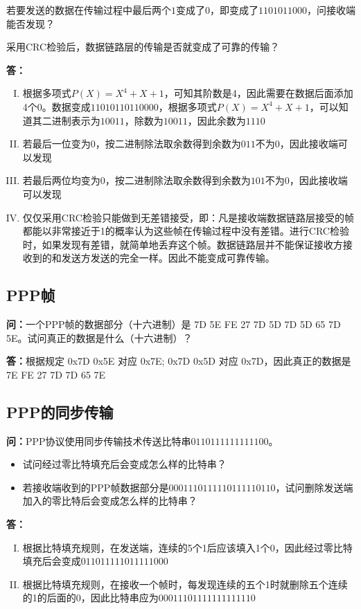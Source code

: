 \documentclass[12pt,hyperref,a4paper,UTF8]{ctexart}
\begin{document}
若要发送的数据在传输过程中最后两个$1$变成了$0$，即变成了$1101011000$，问接收端能否发现？

采用CRC检验后，数据链路层的传输是否就变成了可靠的传输？

\textbf{答：}
\begin{enumerate}[I.]
    \item 根据多项式$P(X)=X^4+X+1$，可知其阶数是4，因此需要在数据后面添加4个$0$。数据变成$11010110110000$，根据多项式$P(X)=X^4+X+1$，可以知道其二进制表示为$10011$，除数为$10011$，因此余数为$1110$
    \item  若最后一位变为$0$，按二进制除法取余数得到余数为$011$不为$0$，因此接收端可以发现 
    \item  若最后两位均变为$0$，按二进制除法取余数得到余数为$101$不为$0$，因此接收端可以发现
    \item 仅仅采用CRC检验只能做到无差错接受，即：凡是接收端数据链路层接受的帧都能以非常接近于1的概率认为这些帧在传输过程中没有差错。进行CRC检验时，如果发现有差错，就简单地丢弃这个帧。数据链路层并不能保证接收方接收到的和发送方发送的完全一样。因此不能变成可靠传输。
\end{enumerate}


\subsection{PPP帧}
\textbf{问：}一个PPP帧的数据部分（十六进制）是 7D 5E FE 27 7D 5D 7D 5D 65 7D 5E。试问真正的数据是什么（十六进制）？

\textbf{答：}根据规定 0x7D 0x5E 对应 0x7E; 0x7D 0x5D 对应 0x7D，因此真正的数据是 7E FE 27 7D 7D 65 7E

\subsection{PPP的同步传输}
\textbf{问：}PPP协议使用同步传输技术传送比特串$0110111111111100$。
\begin{itemize}
    \item 试问经过零比特填充后会变成怎么样的比特串？
    \item 若接收端收到的PPP帧数据部分是$0001110111110111110110$，试问删除发送端加入的零比特后会变成怎么样的比特串？
\end{itemize}

\textbf{答：}
\begin{enumerate}[I.]
    \item 根据比特填充规则，在发送端，连续的5个1后应该填入1个0，因此经过零比特填充后会变成$011011111011111000$
    \item 根据比特填充规则，在接收一个帧时，每发现连续的五个1时就删除五个连续的1的后面的0，因此比特串应为$00011101111111111110$
\end{enumerate}
\end{document}

